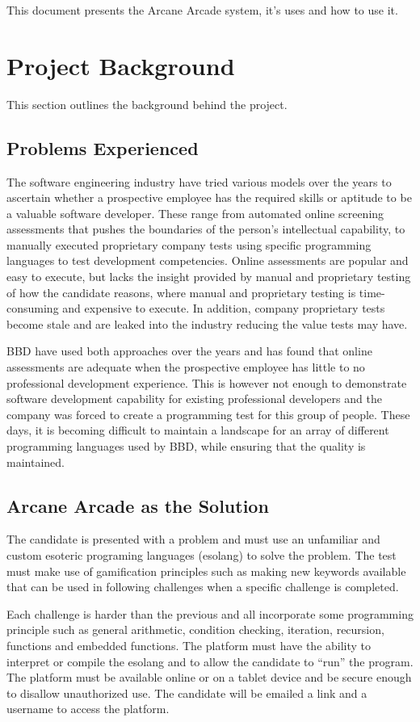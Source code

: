 \documentclass[english]{article}
\begin{document}
		 This document presents the Arcane Arcade system, it's uses and how to use it.

	\section{Project Background}
	This section outlines the background behind the project.
		\subsection{Problems Experienced}
		The software engineering industry have tried various models over the years to ascertain whether a prospective employee has the required skills or aptitude to be a valuable software developer. These range from automated online screening assessments that pushes the boundaries of the person’s intellectual capability, to manually executed proprietary company tests using specific programming languages to test development competencies. Online assessments are popular and easy to execute, but lacks the insight provided by manual and proprietary testing of how the candidate reasons, where manual and proprietary testing is time-consuming and expensive to execute. In addition, company proprietary tests become stale and are leaked into the industry reducing the value tests may have.
		
		BBD have used both approaches over the years and has found that online assessments are adequate when the prospective employee has little to no professional development experience. This is however not enough to demonstrate software development capability for existing professional developers and the company was forced to create a programming test for this group of people. These days, it is becoming difficult to maintain a landscape for an array of different programming languages used by BBD, while ensuring that the quality is maintained.

		\subsection{Arcane Arcade as the Solution}
		The candidate is presented with a problem and must use an unfamiliar and custom esoteric programing languages (esolang) to solve the problem. The test must make use of gamification principles such as making new keywords available that can be used in following challenges when a specific challenge is completed. 
		
		Each challenge is harder than the previous and all incorporate some programming principle such as general arithmetic, condition checking, iteration, recursion, functions and embedded functions. The platform must have the ability to interpret or compile the esolang and to allow the candidate to “run” the program. The platform must be available online or on a tablet device and be secure enough to disallow unauthorized use. The candidate will be emailed a link and a username to access the platform. 
		
\end{document}
